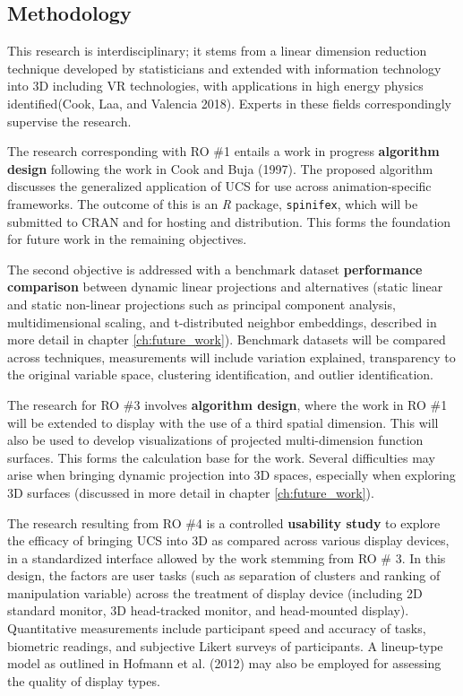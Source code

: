 \documentclass[11,]{article}
\begin{document}
\hypertarget{methodology}{%
\subsection{Methodology}\label{methodology}}

This research is interdisciplinary; it stems from a linear dimension reduction technique developed by statisticians and extended with information technology into 3D including VR technologies, with applications in high energy physics identified(Cook, Laa, and Valencia 2018). Experts in these fields correspondingly supervise the research.

The research corresponding with RO \#1 entails a work in progress \textbf{algorithm design} following the work in Cook and Buja (1997). The proposed algorithm discusses the generalized application of UCS for use across animation-specific frameworks. The outcome of this is an \emph{R} package, \texttt{spinifex}, which will be submitted to CRAN and for hosting and distribution. This forms the foundation for future work in the remaining objectives.

The second objective is addressed with a benchmark dataset \textbf{performance comparison} between dynamic linear projections and alternatives (static linear and static non-linear projections such as principal component analysis, multidimensional scaling, and t-distributed neighbor embeddings, described in more detail in chapter \ref{ch:future_work}). Benchmark datasets will be compared across techniques, measurements will include variation explained, transparency to the original variable space, clustering identification, and outlier identification.

The research for RO \#3 involves \textbf{algorithm design}, where the work in RO \#1 will be extended to display with the use of a third spatial dimension. This will also be used to develop visualizations of projected multi-dimension function surfaces. This forms the calculation base for the work. Several difficulties may arise when bringing dynamic projection into 3D spaces, especially when exploring 3D surfaces (discussed in more detail in chapter \ref{ch:future_work}).

The research resulting from RO \#4 is a controlled \textbf{usability study} to explore the efficacy of bringing UCS into 3D as compared across various display devices, in a standardized interface allowed by the work stemming from RO \# 3. In this design, the factors are user tasks (such as separation of clusters and ranking of manipulation variable) across the treatment of display device (including 2D standard monitor, 3D head-tracked monitor, and head-mounted display). Quantitative measurements include participant speed and accuracy of tasks, biometric readings, and subjective Likert surveys of participants. A lineup-type model as outlined in Hofmann et al. (2012) may also be employed for assessing the quality of display types.
\end{document}
